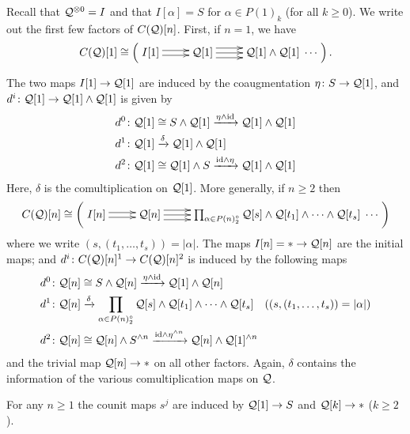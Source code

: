 \begin{example}
Recall that $\mathcal{Q}^{\otimes 0}=I$ and that $I[\alpha]=S$ for $\alpha\in P(1)_k$ (for all $k\geq 0$). We write out the first few factors of $C(\mathcal{Q})[n]$. First, if $n=1$, we have \begin{equation}
    C(\Cal{Q})[1]\cong \left(\xymatrix{ 
        I[1] \ar@<.5ex>[r] \ar@<-.5ex>[r] &
        \Cal{Q}[1] \ar@<1ex>[r] \ar[r] \ar@<-1ex>[r] &
        \Cal{Q}[1]\wedge \Cal{Q}[1] \; \cdots
    }\right).
\end{equation}

The two maps $I[1]\to \mathcal{Q}[1]$ are induced by the coaugmentation $\eta\colon S\to \mathcal{Q}[1]$, and $d^i\colon \mathcal{Q}[1]\to \mathcal{Q}[1]\wedge \mathcal{Q}[1]$ is given by \begin{align*}
        d^0\colon& \mathcal{Q}[1]  \cong S\wedge \mathcal{Q}[1] \xrightarrow{\eta\wedge \mathrm{id}} \mathcal{Q}[1]\wedge \mathcal{Q}[1] \\
        d^1\colon& \mathcal{Q}[1] \xrightarrow{\delta} \mathcal{Q}[1]\wedge \mathcal{Q}[1]   \\
        d^2\colon& \mathcal{Q}[1]  \cong \mathcal{Q}[1]\wedge S\xrightarrow{\mathrm{id}\wedge \eta} \mathcal{Q}[1]\wedge \mathcal{Q}[1]
    \end{align*}
    Here, $\delta$ is the comultiplication on $\mathcal{Q}[1]$. More generally, if $n\geq 2$ then \begin{equation}
        C(\Cal{Q})[n]\cong \left( \xymatrix{ 
            I[n] \ar@<.5ex>[r] \ar@<-.5ex>[r] &
            \Cal{Q}[n] \ar@<1ex>[r] \ar[r] \ar@<-1ex>[r] &
            \prod_{\alpha\in P(n)_2^{\circ}}  \Cal{Q}[s]\wedge \Cal{Q}[t_1]\wedge\cdots\wedge \Cal{Q}[t_{s}] \; \cdots
        }\right)
    \end{equation}
    where we write $(s,(t_1,\dots,t_s))=|\alpha|$. The maps $I[n]=*\to \mathcal{Q}[n]$ are the initial maps; and $d^i\colon C(\mathcal{Q})[n]^1\to C(\mathcal{Q})[n]^2$ is induced by the following maps \begin{align*}
        d^0 \colon & \mathcal{Q}[n]\cong S\wedge \mathcal{Q}[n] \xrightarrow{\eta\wedge \mathrm{id}} \mathcal{Q}[1]\wedge \mathcal{Q}[n] 
        \\
        d^1 \colon & \mathcal{Q}[n] \xrightarrow{\delta} \prod_{\alpha\in P(n)^{\circ}_2} \mathcal{Q}[s] \wedge \mathcal{Q}[t_1]\wedge\cdots \wedge \mathcal{Q}[t_s]  
        \quad ((s,(t_1,\dots,t_s))=|\alpha|)
        \\
        d^2 \colon & \mathcal{Q}[n]\cong \mathcal{Q}[n] \wedge S^{\wedge n} \xrightarrow{\mathrm{id}\wedge \eta^{\wedge n}} \mathcal{Q}[n] \wedge \mathcal{Q}[1]^{\wedge n}
    \end{align*}
    and the trivial map $\mathcal{Q}[n]\to *$ on all other factors. Again, $\delta$ contains the information of the various comultiplication maps on $\mathcal{Q}$. 
    
    For any $n\geq 1$ the counit maps $s^j$ are induced by $\mathcal{Q}[1]\to S$ and $\mathcal{Q}[k]\to *$ ($k\geq 2$). 
\end{example}





